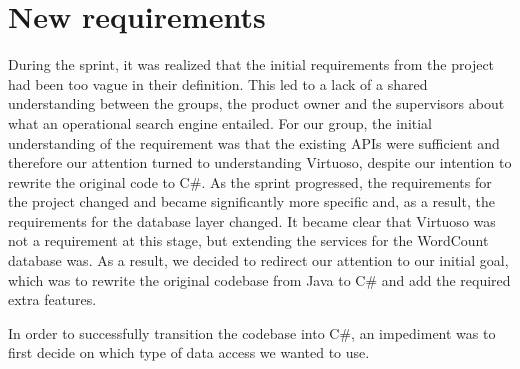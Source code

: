 \section{New requirements} \label{ssec:newRequirements}
During the sprint, it was realized that the initial requirements from the \knox{} project had been too vague in their definition. 
This led to a lack of a shared understanding between the groups, the product owner and the supervisors about what an operational search engine entailed. 
For our group, the initial understanding of the requirement was that the existing APIs were sufficient and therefore our attention turned to understanding Virtuoso, despite our intention to rewrite the original code to C\#. 
As the sprint progressed, the requirements for the \knox{} project changed and became significantly more specific and, as a result, the requirements for the database layer changed.
It became clear that Virtuoso was not a requirement at this stage, but extending the services for the WordCount database was. 
As a result, we decided to redirect our attention to our initial goal, which was to rewrite the original codebase from Java to C\# and add the required extra features.

In order to successfully transition the codebase into C\#, an impediment was to first decide on which type of data access we wanted to use.
